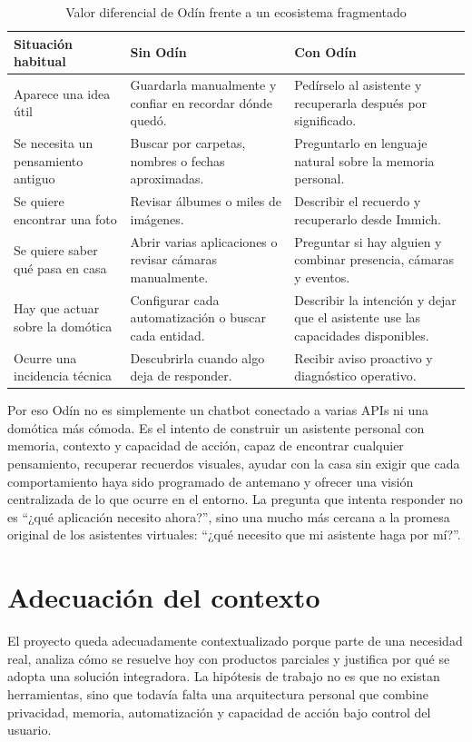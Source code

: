 \begin{table}[H]
  \centering
  \caption{Valor diferencial de Odín frente a un ecosistema fragmentado}
  \label{tab:valor-diferencial-odin}
  \begin{tabularx}{\textwidth}{lXX}
    \toprule
    Situación habitual & Sin Odín & Con Odín \\
    \midrule
    Aparece una idea útil & Guardarla manualmente y confiar en recordar dónde quedó. & Pedírselo al asistente y recuperarla después por significado. \\
    Se necesita un pensamiento antiguo & Buscar por carpetas, nombres o fechas aproximadas. & Preguntarlo en lenguaje natural sobre la memoria personal. \\
    Se quiere encontrar una foto & Revisar álbumes o miles de imágenes. & Describir el recuerdo y recuperarlo desde Immich. \\
    Se quiere saber qué pasa en casa & Abrir varias aplicaciones o revisar cámaras manualmente. & Preguntar si hay alguien y combinar presencia, cámaras y eventos. \\
    Hay que actuar sobre la domótica & Configurar cada automatización o buscar cada entidad. & Describir la intención y dejar que el asistente use las capacidades disponibles. \\
    Ocurre una incidencia técnica & Descubrirla cuando algo deja de responder. & Recibir aviso proactivo y diagnóstico operativo. \\
    \bottomrule
  \end{tabularx}
\end{table}

Por eso Odín no es simplemente un chatbot conectado a varias APIs ni una domótica más cómoda. Es el intento de construir un asistente personal con memoria, contexto y capacidad de acción, capaz de encontrar cualquier pensamiento, recuperar recuerdos visuales, ayudar con la casa sin exigir que cada comportamiento haya sido programado de antemano y ofrecer una visión centralizada de lo que ocurre en el entorno. La pregunta que intenta responder no es ``¿qué aplicación necesito ahora?'', sino una mucho más cercana a la promesa original de los asistentes virtuales: ``¿qué necesito que mi asistente haga por mí?''.

\section{Adecuación del contexto}
El proyecto queda adecuadamente contextualizado porque parte de una necesidad real, analiza cómo se resuelve hoy con productos parciales y justifica por qué se adopta una solución integradora. La hipótesis de trabajo no es que no existan herramientas, sino que todavía falta una arquitectura personal que combine privacidad, memoria, automatización y capacidad de acción bajo control del usuario.

